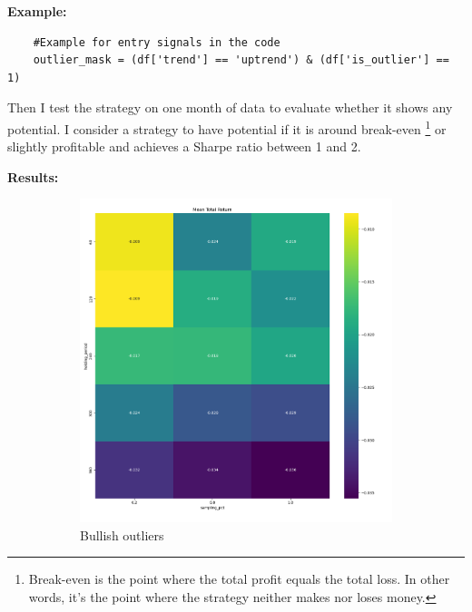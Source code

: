 \documentclass[12pt]{article}
\begin{document}
\newpage
\textbf{Example:}

\begin{verbatim}
    #Example for entry signals in the code
    outlier_mask = (df['trend'] == 'uptrend') & (df['is_outlier'] == 1) 
\end{verbatim}

Then I test the strategy on one month of data to evaluate whether it shows any potential. I consider a strategy to have potential if it is around break-even \footnote{Break-even is the point where the total profit equals the total loss. In other words, it's the point where the strategy neither makes nor loses money.} or slightly profitable and achieves a Sharpe ratio between 1 and 2.

\textbf{Results:}

\begin{figure}[H]
    \centering
    \begin{subfigure}[b]{0.48\textwidth}
        \includegraphics[width=\textwidth,height=0.3\textheight,keepaspectratio]{imgs/example_backtest_for_thesis.png}
        \caption{Bullish outliers}
        \label{fig:bullish_outliers}
    \end{subfigure}
    \hfill
    \begin{subfigure}[b]{0.48\textwidth}

\end{subfigure}
\end{figure}
\end{document}
